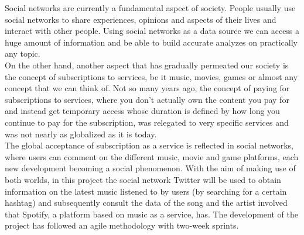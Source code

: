 

\nonzeroparskip Social networks are currently a fundamental aspect of society. People usually use social networks to share experiences, opinions and aspects of their lives and interact with other people. Using social networks as a data source we can access a huge amount of information and be able to build accurate analyzes on practically any topic.\\

\nonzeroparskip On the other hand, another aspect that has gradually permeated our society is the concept of subscriptions to services, be it music, movies, games or almost any concept that we can think of. Not so many years ago, the concept of paying for subscriptions to services, where you don't actually own the content you pay for and instead get temporary access whose duration is defined by how long you continue to pay for the subscription, was relegated to very specific services and was not nearly as globalized as it is today.\\

\nonzeroparskip The global acceptance of subscription as a service is reflected in social networks, where users can comment on the different music, movie and game platforms, each new development becoming a social phenomenon. With the aim of making use of both worlds, in this project the social network Twitter will be used to obtain information on the latest music listened to by users (by searching for a certain hashtag) and subsequently consult the data of the song and the artist involved that Spotify, a platform based on music as a service, has. The development of the project has followed an agile methodology with two-week sprints.
